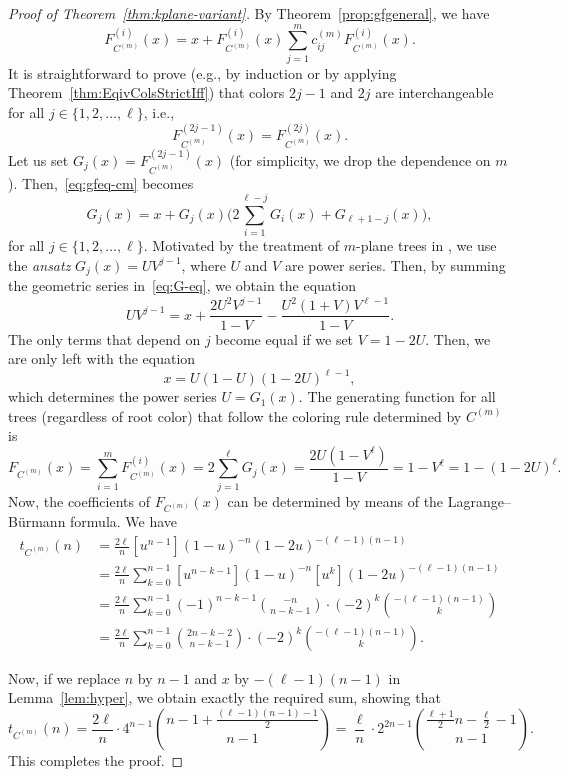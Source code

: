 \documentclass[12pt]{amsart}
\begin{document}
\begin{proof}[Proof of Theorem~\ref{thm:kplane-variant}]
    By Theorem~\ref{prop:gfgeneral}, we have
\begin{equation}\label{eq:gfeq-cm}
    F_{C^{(m)}}^{(i)}(x)=x+ F_{C^{(m)}}^{(i)}(x) \sum_{j=1}^mc_{ij}^{(m)}F_{C^{(m)}}^{(i)}(x).
    \end{equation}
It is straightforward to prove (e.g., by induction or by applying Theorem~\ref{thm:EqivColsStrictIff}) that colors $2j-1$ and $2j$ are interchangeable for all $j \in \{1,2,\ldots,\ell\}$, i.e.,
$$F_{C^{(m)}}^{(2j-1)}(x) = F_{C^{(m)}}^{(2j)}(x).$$
Let us set $G_j(x) = F_{C^{(m)}}^{(2j-1)}(x)$ (for simplicity, we drop the dependence on $m$). Then,~\eqref{eq:gfeq-cm} becomes
\begin{equation}\label{eq:G-eq}
G_j(x) = x + G_j(x) \Big( 2 \sum_{i=1}^{\ell-j} G_i(x) + G_{\ell+1-j}(x) \Big),
\end{equation}
for all $j \in \{1,2,\ldots,\ell\}$.
Motivated by the treatment of $m$-plane trees in \cite{GPW2010Bijections}, we use the \emph{ansatz} $G_j(x) = U V^{j-1}$, where $U$ and $V$ are power series. Then, by summing the geometric series in~\eqref{eq:G-eq}, we obtain the equation
\[UV^{j-1} = x + \frac{2U^2 V^{j-1}}{1-V} - \frac{U^2(1+V)V^{\ell-1}}{1-V}.
\]
The only terms that depend on $j$ become equal if we set $V = 1 - 2U$. Then, we are only left with the equation
\[x = U(1-U)(1-2U)^{\ell-1},\]
which determines the power series $U = G_1(x)$. The generating function for all trees (regardless of root color) that follow the coloring rule determined by $C^{(m)}$ is
\[F_{C^{(m)}}(x) = \sum_{i=1}^m F_{C^{(m)}}^{(i)}(x) = 2 \sum_{j=1}^{\ell} G_j(x) = \frac{2U(1-V^{\ell})}{1-V} = 1-V^{\ell} = 1 - (1-2U)^{\ell}.\]
Now, the coefficients of $F_{C^{(m)}}(x)$ can be determined by means of the Lagrange--B\"urmann formula. We have
\begin{align*}
t_{C^{(m)}}(n) &= \frac{2\ell}{n} [u^{n-1}] (1-u)^{-n}(1-2u)^{-(\ell-1)(n-1)} \\
&= \frac{2\ell}{n} \sum_{k=0}^{n-1} [u^{n-k-1}](1-u)^{-n} [u^k] (1-2u)^{-(\ell-1)(n-1)} \\
&= \frac{2\ell}{n} \sum_{k=0}^{n-1} (-1)^{n-k-1} \binom{-n}{n-k-1} \cdot (-2)^k \binom{-(\ell-1)(n-1)}{k} \\
&= \frac{2\ell}{n} \sum_{k=0}^{n-1} \binom{2n-k-2}{n-k-1} \cdot (-2)^k \binom{-(\ell-1)(n-1)}{k}.
\end{align*}


Now, if we replace $n$ by $n-1$ and $x$ by $-(\ell-1)(n-1)$ in Lemma~\ref{lem:hyper}, we obtain exactly the required sum, showing that
\[t_{C^{(m)}}(n) = \frac{2\ell}{n} \cdot 4^{n-1} \binom{n -1 + \frac{(\ell-1)(n-1)-1}{2}}{n-1} = \frac{\ell}{n} \cdot 2^{2n-1} \binom{\frac{\ell+1}{2} n - \frac{\ell}{2}-1}{n-1}.\]
This completes the proof.
\end{proof}
\end{document}
